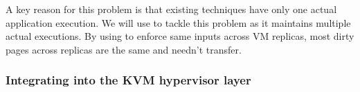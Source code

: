 A key reason for this problem is that existing techniques have only one actual 
application execution. We will use \falcon to tackle this problem as it 
maintains multiple actual executions. By using \falcon to enforce same inputs 
across VM replicas, most dirty pages across replicas are the same and needn't 
transfer.







% 



\vspace{-.15in}\subsubsection{Integrating \falcon into the KVM hypervisor 
layer} 
\label{sec:vm-arch}\vspace{-.075in}









